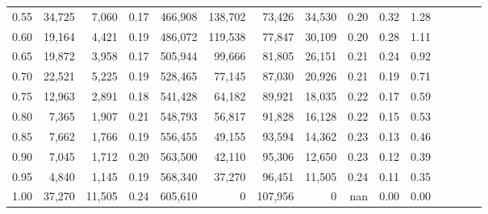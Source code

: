 \begin{tabular}{rrrcrrrrrrrrrrr}
0.55 &  34,725 &   7,060 &                                       0.17 &  466,908 &  138,702 &   73,426 &  34,530 &  0.20 &  0.32 &                         1.28 \\
0.60 &  19,164 &   4,421 &                                       0.19 &  486,072 &  119,538 &   77,847 &  30,109 &  0.20 &  0.28 &                         1.11 \\
0.65 &  19,872 &   3,958 &                                       0.17 &  505,944 &   99,666 &   81,805 &  26,151 &  0.21 &  0.24 &                         0.92 \\
0.70 &  22,521 &   5,225 &                                       0.19 &  528,465 &   77,145 &   87,030 &  20,926 &  0.21 &  0.19 &                         0.71 \\
0.75 &  12,963 &   2,891 &                                       0.18 &  541,428 &   64,182 &   89,921 &  18,035 &  0.22 &  0.17 &                         0.59 \\
0.80 &   7,365 &   1,907 &                                       0.21 &  548,793 &   56,817 &   91,828 &  16,128 &  0.22 &  0.15 &                         0.53 \\
0.85 &   7,662 &   1,766 &                                       0.19 &  556,455 &   49,155 &   93,594 &  14,362 &  0.23 &  0.13 &                         0.46 \\
0.90 &   7,045 &   1,712 &                                       0.20 &  563,500 &   42,110 &   95,306 &  12,650 &  0.23 &  0.12 &                         0.39 \\
0.95 &   4,840 &   1,145 &                                       0.19 &  568,340 &   37,270 &   96,451 &  11,505 &  0.24 &  0.11 &                         0.35 \\
1.00 &  37,270 &  11,505 &                                       0.24 &  605,610 &        0 &  107,956 &       0 &   nan &  0.00 &                         0.00 \\
\bottomrule
\end{tabular}
